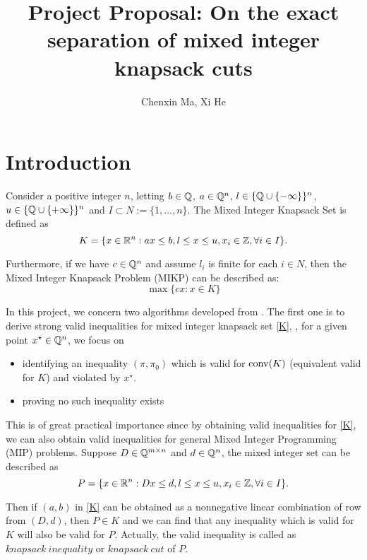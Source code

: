 \documentclass[a4paper,10pt]{article}
\title{Project Proposal: On the exact separation of mixed integer knapsack cuts}
\author{Chenxin Ma, Xi He \todo{Just follow the first name}}
\begin{document}
\maketitle
 
\section{Introduction} 
Consider a positive integer $n$, letting $b\in\mathbb{Q}$, $a\in \mathbb{Q}^n$, $l\in \{\mathbb{Q}\cup \{-\infty\}\}^n$, $u\in \{\mathbb{Q}\cup \{+\infty\}\}^n$ and $I\subset N :=
\{1,...,n\}$. The Mixed Integer Knapsack Set is defined as
\begin{equation}\label{K}
 K=\{x\in \mathbb{R}^n : ax\leq b, l\leq x\leq u, x_i\in \mathbb{Z}, \forall i\in I\}.
\end{equation}

Furthermore, if we have $c\in \mathbb{Q}^n$ and assume $l_i$ is finite for each $i\in N$, then the Mixed Integer Knapsack Problem (MIKP) can be 
described as:
\begin{equation}\label{MIKP}
 \max \{cx:x\in K\}
\end{equation}


In this project, we concern two algorithms developed from \cite{fukasawa2011exact}. The first one is to derive strong valid inequalities for mixed integer knapsack set \eqref{K}, \ie, for a given 
point $x^\star\in \mathbb{Q}^n$, we focus on
\begin{itemize}
 \item identifying an inequality $(\pi,\pi_0)$ which is valid for $\operatorname{conv}(K)$ (equivalent valid for $K$) and violated by $x^\star$.
 \item proving no such inequality exists
\end{itemize}

This is of great practical importance since by obtaining valid inequalities for \eqref{K}, we can also obtain valid inequalities for general Mixed Integer Programming 
(MIP) problems. Suppose $D\in \mathbb{Q}^{m\times n}$ and $d\in \mathbb{Q}^n$, the mixed integer set can be described as
\begin{equation}\label{P}
 P=\{x\in \mathbb{R}^n: Dx\leq d, l\leq x\leq u, x_i\in \mathbb{Z}, \forall i \in I\}.
\end{equation}

Then if $(a,b)$ in \eqref{K} can be obtained as a nonnegative linear combination of row from $(D,d)$, then $P\in K$ and we can find that any inequality
 which is valid for  $K$ will also be valid for $P$. Actually, the valid inequality is called as $knapsack~inequality$ or $knapsack~cut$ of $P$.
 
\end{document}

